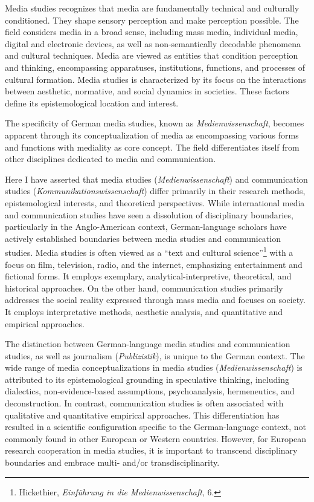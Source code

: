 \documentclass{tufte-handout}
\begin{document}
Media studies recognizes that media are fundamentally technical and
culturally conditioned. They shape sensory perception and make
perception possible. The field considers media in a broad sense,
including mass media, individual media, digital and electronic devices,
as well as non-semantically decodable phenomena and cultural techniques.
Media are viewed as entities that condition perception and thinking,
encompassing apparatuses, institutions, functions, and processes of
cultural formation. Media studies is characterized by its focus on the
interactions between aesthetic, normative, and social dynamics in
societies. These factors define its epistemological location and
interest.

The specificity of German media studies, known as
\emph{Medienwissenschaft}, becomes apparent through its
conceptualization of media as encompassing various forms and functions
with mediality as core concept. The field differentiates itself from
other disciplines dedicated to media and communication.

Here I have asserted that media studies (\emph{Medienwissenschaft}) and
communication studies (\emph{Kommunikationswissenschaft}) differ
primarily in their research methods, epistemological interests, and
theoretical perspectives. While international media and communication
studies have seen a dissolution of disciplinary boundaries, particularly
in the Anglo-American context, German-language scholars have actively
established boundaries between media studies and communication studies.
Media studies is often viewed as a ``text and cultural
science''\footnote{Hickethier, \emph{Einführung in die
  Medienwissenschaft}, 6.} with a focus on film, television, radio, and
the internet, emphasizing entertainment and fictional forms. It employs
exemplary, analytical-interpretive, theoretical, and historical
approaches. On the other hand, communication studies primarily addresses
the social reality expressed through mass media and focuses on society.
It employs interpretative methods, aesthetic analysis, and quantitative
and empirical approaches.

The distinction between German-language media studies and communication
studies, as well as journalism (\emph{Publizistik}), is unique to the
German context. The wide range of media conceptualizations in media
studies (\emph{Medienwissenschaft}) is attributed to its epistemological
grounding in speculative thinking, including dialectics,
non-evidence-based assumptions, psychoanalysis, hermeneutics, and
deconstruction. In contrast, communication studies is often associated
with qualitative and quantitative empirical approaches. This
differentiation has resulted in a scientific configuration specific to
the German-language context, not commonly found in other European or
Western countries. However, for European research cooperation in media
studies, it is important to transcend disciplinary boundaries and
embrace multi- and/or transdisciplinarity.
\end{document}
